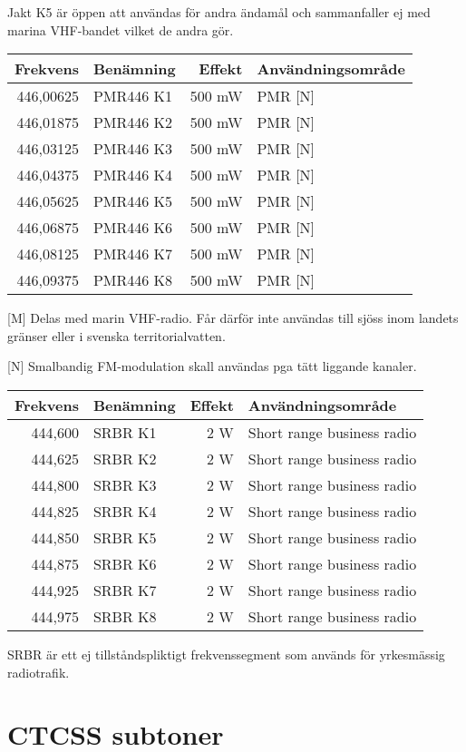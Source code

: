 \documentclass[10pt,swedish,a4paper]{article}
\begin{document}
Jakt K5 är öppen att användas för andra ändamål och sammanfaller ej med marina VHF-bandet vilket de andra gör.

\begin{tabular}{rlrl}
	 Frekvens & Benämning & Effekt & Användningsområde \\ \hline
	446,00625 & PMR446 K1 & 500 mW & PMR [N]              \\
	446,01875 & PMR446 K2 & 500 mW & PMR [N]              \\
	446,03125 & PMR446 K3 & 500 mW & PMR [N]              \\
	446,04375 & PMR446 K4 & 500 mW & PMR [N]              \\
	446,05625 & PMR446 K5 & 500 mW & PMR [N]              \\
	446,06875 & PMR446 K6 & 500 mW & PMR [N]              \\
	446,08125 & PMR446 K7 & 500 mW & PMR [N]              \\
	446,09375 & PMR446 K8 & 500 mW & PMR [N]
\end{tabular}

[M] Delas med marin VHF-radio. Får därför inte användas till sjöss inom landets gränser eller i svenska territorialvatten.

[N] Smalbandig FM-modulation skall användas pga tätt liggande kanaler.


\begin{tabular}{rlrl}
	Frekvens & Benämning & Effekt & Användningsområde          \\ \hline
	 444,600 & SRBR K1   &    2 W & Short range business radio \\
	 444,625 & SRBR K2   &    2 W & Short range business radio \\
	 444,800 & SRBR K3   &    2 W & Short range business radio \\
	 444,825 & SRBR K4   &    2 W & Short range business radio \\
	 444,850 & SRBR K5   &    2 W & Short range business radio \\
	 444,875 & SRBR K6   &    2 W & Short range business radio \\
	 444,925 & SRBR K7   &    2 W & Short range business radio \\
	 444,975 & SRBR K8   &    2 W & Short range business radio
\end{tabular}

SRBR är ett ej tillståndspliktigt frekvenssegment som används för yrkesmässig radiotrafik.

\section{CTCSS subtoner}
\end{document}
